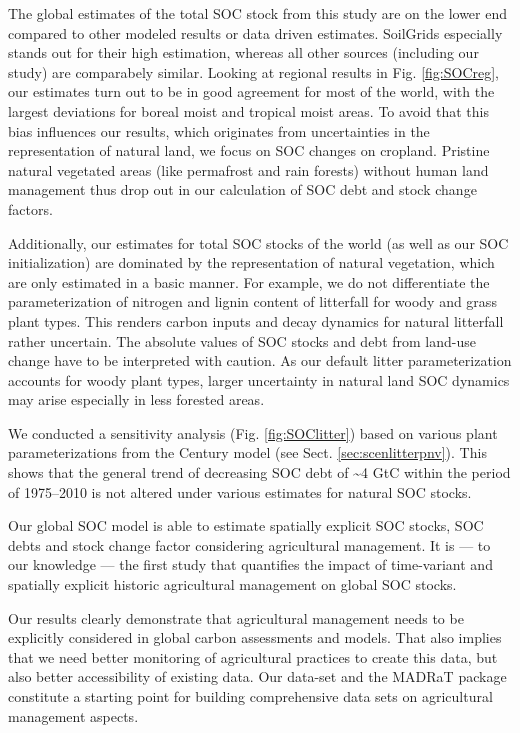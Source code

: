 \documentclass[gc, manuscript]{copernicus}
\begin{document}
The global estimates of the total SOC stock from this study are on the lower end compared to other modeled results or data driven estimates. SoilGrids \citep{hengl_soilgrids250m_2017} especially stands out for their high estimation, whereas all other sources (including our study) are comparabely similar. Looking at regional results in Fig. \ref{fig:SOCreg}, our estimates turn out to be in good agreement for most of the world, with the largest deviations for boreal moist and tropical moist areas. To avoid that this bias influences our results, which originates from uncertainties in the representation of natural land, we focus on SOC changes on cropland. Pristine natural vegetated areas (like permafrost and rain forests) without human land management thus drop out in our calculation of SOC debt and stock change factors.

Additionally, our estimates for total SOC stocks of the world (as well as our SOC initialization) are dominated by the representation of natural vegetation, which are only estimated in a basic manner. For example, we do not differentiate the parameterization of nitrogen and lignin content of litterfall for woody and grass plant types. This renders carbon inputs and decay dynamics for natural litterfall rather uncertain. The absolute values of SOC stocks and debt from land-use change have to be interpreted with caution. As our default litter parameterization accounts for woody plant types, larger uncertainty in natural land SOC dynamics may arise especially in less forested areas.

We conducted a sensitivity analysis (Fig. \ref{fig:SOClitter}) based on various plant parameterizations from the Century model (see Sect. \ref{sec:scenlitterpnv}). This shows that the general trend of decreasing SOC debt of \textasciitilde4 GtC within the period of 1975--2010 is not altered under various estimates for natural SOC stocks.
\newpage

\conclusions

Our global SOC model is able to estimate spatially explicit SOC stocks, SOC debts and stock change factor considering agricultural management. It is --- to our knowledge --- the first study that quantifies the impact of time-variant and spatially explicit historic agricultural management on global SOC stocks.

Our results clearly demonstrate that agricultural management needs to be explicitly considered in global carbon assessments and models. That also implies that we need better monitoring of agricultural practices to create this data, but also better accessibility of existing data. Our data-set and the MADRaT package \citep{dietrich_madrat_2020} constitute a starting point for building comprehensive data sets on agricultural management aspects.
\end{document}
